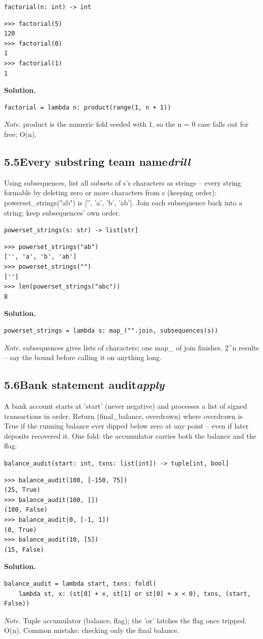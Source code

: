 \documentclass[10pt,letterpaper]{book}
\begin{document}
\noindent\texttt{factorial(n: int) -> int}
\begin{lstlisting}[style=ex]
>>> factorial(5)
120
>>> factorial(0)
1
>>> factorial(1)
1
\end{lstlisting}
\noindent\textbf{Solution.}
\begin{lstlisting}[style=code]
factorial = lambda n: product(range(1, n + 1))
\end{lstlisting}
\noindent\textit{Note.} product is the numeric fold seeded with 1, so the n = 0 case falls out for free; O(n).

\subsection*{5.5\quad Every substring team name\hfill\textnormal{\textit{drill}}}
Using subsequences, list all subsets of s's characters as strings -- every string formable by deleting zero or more characters from s (keeping order): powerset\_strings("ab") is ['', 'a', 'b', 'ab']. Join each subsequence back into a string; keep subsequences' own order.

\noindent\texttt{powerset\_strings(s: str) -> list[str]}
\begin{lstlisting}[style=ex]
>>> powerset_strings("ab")
['', 'a', 'b', 'ab']
>>> powerset_strings("")
['']
>>> len(powerset_strings("abc"))
8
\end{lstlisting}
\noindent\textbf{Solution.}
\begin{lstlisting}[style=code]
powerset_strings = lambda s: map_("".join, subsequences(s))
\end{lstlisting}
\noindent\textit{Note.} subsequences gives lists of characters; one map\_ of join finishes. 2\^{}n results -- say the bound before calling it on anything long.

\subsection*{5.6\quad Bank statement audit\hfill\textnormal{\textit{apply}}}
A bank account starts at 'start' (never negative) and processes a list of signed transactions in order. Return (final\_balance, overdrawn) where overdrawn is True if the running balance ever dipped below zero at any point -- even if later deposits recovered it. One fold: the accumulator carries both the balance and the flag.

\noindent\texttt{balance\_audit(start: int, txns: list[int]) -> tuple[int, bool]}
\begin{lstlisting}[style=ex]
>>> balance_audit(100, [-150, 75])
(25, True)
>>> balance_audit(100, [])
(100, False)
>>> balance_audit(0, [-1, 1])
(0, True)
>>> balance_audit(10, [5])
(15, False)
\end{lstlisting}
\noindent\textbf{Solution.}
\begin{lstlisting}[style=code]
balance_audit = lambda start, txns: foldl(
    lambda st, x: (st[0] + x, st[1] or st[0] + x < 0), txns, (start, False))
\end{lstlisting}
\noindent\textit{Note.} Tuple accumulator (balance, flag); the 'or' latches the flag once tripped. O(n). Common mistake: checking only the final balance.
\end{document}
